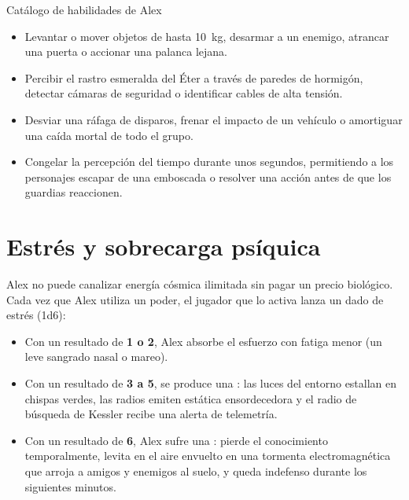 \begin{CajaEter}{Catálogo de habilidades de Alex}
\begin{itemize}
  \item {} Levantar o mover objetos de hasta 10~kg, desarmar a un enemigo, atrancar una puerta o accionar una palanca lejana.
  \item {} Percibir el rastro esmeralda del Éter a través de paredes de hormigón, detectar cámaras de seguridad o identificar cables de alta tensión.
  \item {} Desviar una ráfaga de disparos, frenar el impacto de un vehículo o amortiguar una caída mortal de todo el grupo.
  \item {} Congelar la percepción del tiempo durante unos segundos, permitiendo a los personajes escapar de una emboscada o resolver una acción antes de que los guardias reaccionen.
\end{itemize}
\end{CajaEter}

\section{Estrés y sobrecarga psíquica}

Alex no puede canalizar energía cósmica ilimitada sin pagar un precio biológico. Cada vez que Alex utiliza un poder, el jugador que lo activa lanza un dado de estrés (1d6):
\begin{itemize}
  \item Con un resultado de \textbf{1 o 2}, Alex absorbe el esfuerzo con fatiga menor (un leve sangrado nasal o mareo).
  \item Con un resultado de \textbf{3 a 5}, se produce una : las luces del entorno estallan en chispas verdes, las radios emiten estática ensordecedora y el radio de búsqueda de Kessler recibe una alerta de telemetría.
  \item Con un resultado de \textbf{6}, Alex sufre una : pierde el conocimiento temporalmente, levita en el aire envuelto en una tormenta electromagnética que arroja a amigos y enemigos al suelo, y queda indefenso durante los siguientes minutos.
\end{itemize}

